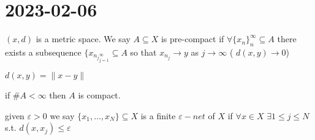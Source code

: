 \section{2023-02-06}

\begin{definition}
	$(x,d)$ is a metric space. We say $A \subseteq X$ is pre-compact if $\forall \{x_n\}_n^{\infty} \subseteq A$ there exists a subsequence $\{x_{n_{j}}_{j=1}^{\infty} \subseteq A$ so that $x_{n_{j}} \to y$ as $j \to \infty$ 
		( $d(x,y) \to 0$)
\end{definition}

\begin{example}
	$d(x,y) = \|x - y\|$
\end{example}

\begin{remark}
	if $\#A < \infty$ then $A$ is compact.
\end{remark}

\begin{definition}
	given $\varepsilon > 0$ we say $\{x_1, \ldots, x_N\} \subseteq X$ is a finite $\varepsilon-net$ of $X$ if $\forall x \in X$  $\exists 1 \leq j \leq N$ s.t. $d(x,x_j) \leq \varepsilon$
\end{definition}


